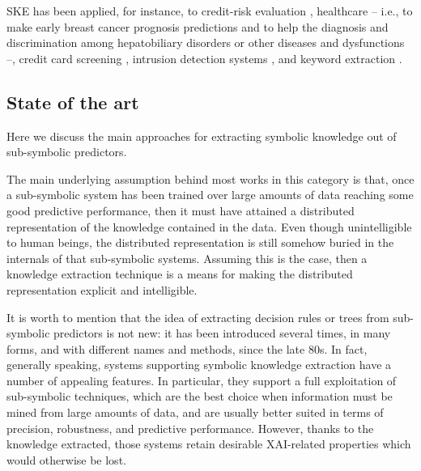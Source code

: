 \documentclass[12pt,a4paper,openright,twoside]{book}
\begin{document}
SKE has been applied, for instance, to credit-risk evaluation \cite{baesens2003using,baesens2001building,steiner2006using},  healthcare -- i.e., to make early breast cancer prognosis predictions \cite{franco2007early} and to help the diagnosis and discrimination among hepatobiliary disorders \cite{hayashi2000comparison} or other diseases and dysfunctions \cite{bologna1997three,bologna2000study} --, credit card screening \cite{setiono2011rule}, intrusion detection systems \cite{hofmann2003rule}, and keyword extraction \cite{azcarraga2012keyword}.

\subsection{State of the art}\label{ssec:ske-soa}

Here we discuss the main approaches for extracting symbolic knowledge out of sub-symbolic predictors.

The main underlying assumption behind most works in this category is that, once a sub-symbolic system has been trained over large amounts of data reaching some good predictive performance, then it must have attained a distributed representation of the knowledge contained in the data.
%
Even though unintelligible to human beings, the distributed representation is still somehow buried in the internals of that sub-symbolic systems.
%
Assuming this is the case, then a knowledge extraction technique is a means for making the distributed representation explicit and intelligible.

It is worth to mention that the idea of extracting decision rules or trees from sub-symbolic predictors is not new: it has been introduced several times, in many forms, and with different names and methods, since the late 80s.
%
In fact, generally speaking, systems supporting symbolic knowledge extraction have a number of appealing features.
%
In particular, they support a full exploitation of sub-symbolic techniques, which are the best choice when information must be mined from large amounts of data, and are usually better suited in terms of precision, robustness, and predictive performance.
%
However, thanks to the knowledge extracted, those systems retain desirable XAI-related properties which would otherwise be lost.
\end{document}
